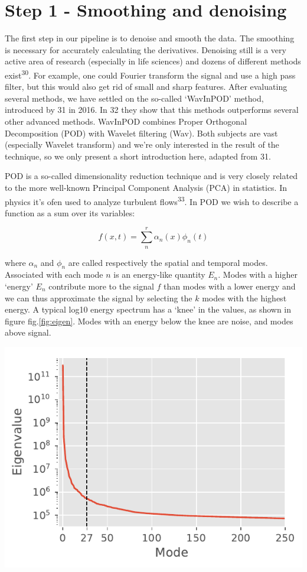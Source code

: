 \documentclass[12pt,a4paper,]{Dissertate}
\begin{document}
\hypertarget{step-1---smoothing-and-denoising}{%
\section{Step 1 - Smoothing and
denoising}\label{step-1---smoothing-and-denoising}}

The first step in our pipeline is to denoise and smooth the data. The
smoothing is necessary for accurately calculating the derivatives.
Denoising still is a very active area of research (especially in life
sciences) and dozens of different methods exist\textsuperscript{30}. For
example, one could Fourier transform the signal and use a high pass
filter, but this would also get rid of small and sharp features. After
evaluating several methods, we have settled on the so-called `WavInPOD'
method, introduced by 31 in 2016. In 32 they show that this methods
outperforms several other advanced methods. WavInPOD combines Proper
Orthogonal Decomposition (POD) with Wavelet filtering (Wav). Both
subjects are vast (especially Wavelet transform) and we're only
interested in the result of the technique, so we only present a short
introduction here, adapted from 31.

POD is a so-called dimensionality reduction technique and is very
closely related to the more well-known Principal Component Analysis
(PCA) in statistics. In physics it's ofen used to analyze turbulent
flows\textsuperscript{33}. In POD we wish to describe a function as a
sum over its variables:

\[
f(x,t)=\sum_n^r \alpha_n(x)\phi_n(t)
\]

where \(\alpha_n\) and \(\phi_n\) are called respectively the spatial
and temporal modes. Associated with each mode \(n\) is an energy-like
quantity \(E_n\). Modes with a higher `energy' \(E_n\) contribute more
to the signal \(f\) than modes with a lower energy and we can thus
approximate the signal by selecting the \(k\) modes with the highest
energy. A typical log10 energy spectrum has a `knee' in the values, as
shown in figure fig.\ref{fig:eigen}. Modes with an energy below the
knee are noise, and modes above signal.

\includegraphics{source/figures/pdf/eigenspectrum.pdf}
\end{document}
